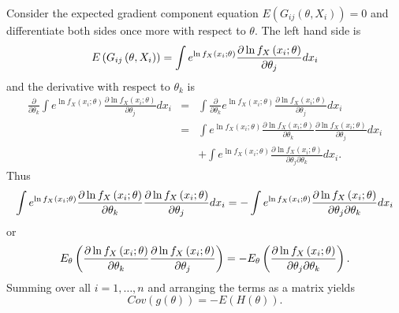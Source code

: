 \documentclass{article}
\begin{document}
Consider the expected gradient component equation $E\left( G_{ij}\left(
\theta ,X_{i}\right) \right) =0$ and differentiate both sides once more with
respect to $\theta $. The left hand side is%
\begin{equation*}
E\left( G_{ij}\left( \theta ,X_{i}\right) \right) =\int e^{\ln f_{X}\left(
x_{i};\theta \right) }\frac{\partial \ln f_{X}\left( x_{i};\theta \right) }{%
\partial \theta _{j}}dx_{i}
\end{equation*}%
and the derivative with respect to $\theta _{k}$ is%
\begin{eqnarray*}
\frac{\partial }{\partial \theta _{k}}\int e^{\ln f_{X}\left( x_{i};\theta
\right) }\frac{\partial \ln f_{X}\left( x_{i};\theta \right) }{\partial
\theta _{j}}dx_{i} &=&\int \frac{\partial }{\partial \theta _{k}}e^{\ln
f_{X}\left( x_{i};\theta \right) }\frac{\partial \ln f_{X}\left(
x_{i};\theta \right) }{\partial \theta _{j}}dx_{i} \\
&=&\int e^{\ln f_{X}\left( x_{i};\theta \right) }\frac{\partial \ln
f_{X}\left( x_{i};\theta \right) }{\partial \theta _{k}}\frac{\partial \ln
f_{X}\left( x_{i};\theta \right) }{\partial \theta _{j}}dx_{i} \\
&&+\int e^{\ln f_{X}\left( x_{i};\theta \right) }\frac{\partial \ln
f_{X}\left( x_{i};\theta \right) }{\partial \theta _{j}\partial \theta _{k}}%
dx_{i}.
\end{eqnarray*}%
Thus%
\begin{equation*}
\int e^{\ln f_{X}\left( x_{i};\theta \right) }\frac{\partial \ln f_{X}\left(
x_{i};\theta \right) }{\partial \theta _{k}}\frac{\partial \ln f_{X}\left(
x_{i};\theta \right) }{\partial \theta _{j}}dx_{i}=-\int e^{\ln f_{X}\left(
x_{i};\theta \right) }\frac{\partial \ln f_{X}\left( x_{i};\theta \right) }{%
\partial \theta _{j}\partial \theta _{k}}dx_{i}
\end{equation*}%
or%
\begin{equation*}
E_{\theta }\left( \frac{\partial \ln f_{X}\left( x_{i};\theta \right) }{%
\partial \theta _{k}}\frac{\partial \ln f_{X}\left( x_{i};\theta \right) }{%
\partial \theta _{j}}\right) =-E_{\theta }\left( \frac{\partial \ln
f_{X}\left( x_{i};\theta \right) }{\partial \theta _{j}\partial \theta _{k}}%
\right) .
\end{equation*}%
Summing over all $i=1,\ldots ,n$ and arranging the terms as a matrix yields%
\begin{equation*}
Cov\left( g\left( \theta \right) \right) =-E\left( H\left( \theta \right)
\right) .
\end{equation*}
\end{document}
